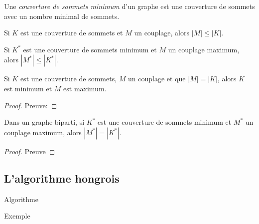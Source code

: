 \begin{mydef}
  Une \emph{couverture de sommets minimum} d’un graphe est une couverture de sommets avec un nombre minimal de sommets.
\end{mydef}

\begin{myrem}
  Si $K$ est une couverture de sommets et $M$ un couplage, alors $|M| \leq |K|$.
\end{myrem}

\begin{myrem}
  Si $K^*$ est une couverture de sommets minimum et $M$ un couplage maximum, alors $|M^*| \leq |K^*|$.
\end{myrem}

\begin{mylem}
  Si $K$ est une couverture de sommets, $M$ un couplage et que $|M| = |K|$, alors $K$ est minimum et $M$ est maximum.
  \begin{proof}
     Preuve: 
  \end{proof}
\end{mylem}

\begin{mytheo} [König]
  Dans un graphe biparti, si $K^*$ est une couverture de sommets minimum et $M^*$ un couplage maximum, alors $|M^*| = |K^*|$.
  \begin{proof}
     Preuve \addTODO
  \end{proof}
\end{mytheo}

\subsection{L'algorithme hongrois}
\begin{myalgo}
  Algorithme \addTODO
\end{myalgo}
\begin{myexem}
  Exemple \addTODO
\end{myexem}